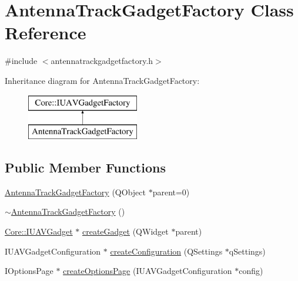 \hypertarget{class_antenna_track_gadget_factory}{\section{\-Antenna\-Track\-Gadget\-Factory \-Class \-Reference}
\label{class_antenna_track_gadget_factory}
}


{\ttfamily \#include $<$antennatrackgadgetfactory.\-h$>$}

\-Inheritance diagram for \-Antenna\-Track\-Gadget\-Factory\-:\begin{figure}[H]
\begin{center}
\leavevmode
\includegraphics[height=2.000000cm]{class_antenna_track_gadget_factory}
\end{center}
\end{figure}
\subsection*{\-Public \-Member \-Functions}
\begin{DoxyCompactItemize}
\item 
\hyperlink{group___antenna_track_gadget_plugin_ga1ef8f35faf1ffe91c15080461b78649c}{\-Antenna\-Track\-Gadget\-Factory} (\-Q\-Object $\ast$parent=0)
\item 
\hyperlink{group___antenna_track_gadget_plugin_ga6d885117d7af90d116622d81273651cd}{$\sim$\-Antenna\-Track\-Gadget\-Factory} ()
\item 
\hyperlink{class_core_1_1_i_u_a_v_gadget}{\-Core\-::\-I\-U\-A\-V\-Gadget} $\ast$ \hyperlink{group___antenna_track_gadget_plugin_ga50d1ad5798eee9e1ca60c3e1bf0559fc}{create\-Gadget} (\-Q\-Widget $\ast$parent)
\item 
\-I\-U\-A\-V\-Gadget\-Configuration $\ast$ \hyperlink{group___antenna_track_gadget_plugin_gaa4cb4bdba7574a5ba89c52f6791bc6d4}{create\-Configuration} (\-Q\-Settings $\ast$q\-Settings)
\item 
\-I\-Options\-Page $\ast$ \hyperlink{group___antenna_track_gadget_plugin_ga7645577ffc0de3e891b3ea2388c73e48}{create\-Options\-Page} (\-I\-U\-A\-V\-Gadget\-Configuration $\ast$config)
\end{DoxyCompactItemize}


